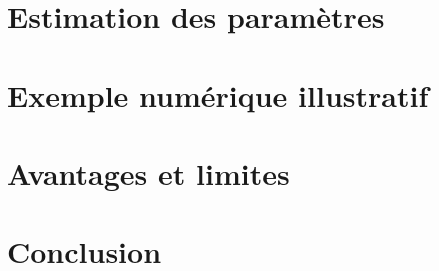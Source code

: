 \documentclass[12pt,a4paper]{article}
\begin{document}
\section{Estimation des paramètres}

\section{Exemple numérique illustratif}

\section{Avantages et limites}

\section{Conclusion}
\end{document}
